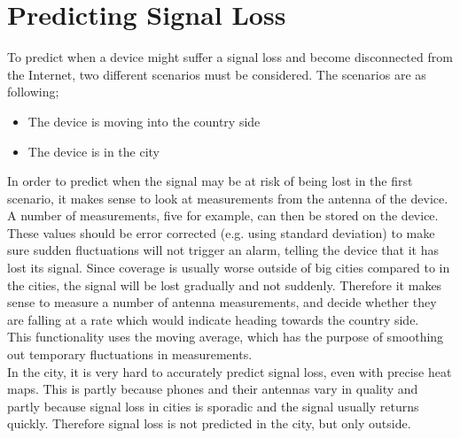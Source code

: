 \section{Predicting Signal Loss}
To predict when a device might suffer a signal loss and become disconnected from the Internet, two different scenarios must be considered. The scenarios are as following;\\

\begin{itemize}
\item The device is moving into the country side
\item The device is in the city 
\end{itemize}

In order to predict when the signal may be at risk of being lost in the first scenario, it makes sense to look at measurements from the antenna of the device. A number of measurements, five for example, can then be stored on the device. These values should be error corrected (e.g. using standard deviation) to make sure sudden fluctuations will not trigger an alarm, telling the device that it has lost its signal. Since coverage is usually worse outside of big cities compared to in the cities, the signal will be lost gradually and not suddenly. Therefore it makes sense to measure a number of antenna measurements, and decide whether they are falling at a rate which would indicate heading towards the country side.\\

This functionality uses the moving average, which has the purpose of smoothing out temporary fluctuations in measurements. \citep{wiki-moving-average}\\

In the city, it is very hard to accurately predict signal loss, even with precise heat maps. This is partly because phones and their antennas vary in quality and partly because signal loss in cities is sporadic and the signal usually returns quickly. Therefore signal loss is not predicted in the city, but only outside. 
